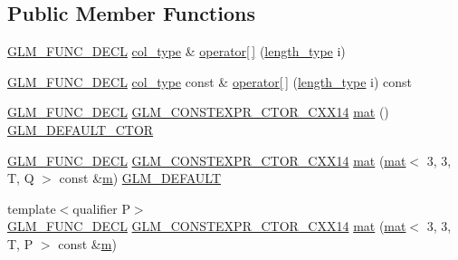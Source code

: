 \subsection*{Public Member Functions}
\begin{DoxyCompactItemize}
\item 
\hyperlink{setup_8hpp_ab2d052de21a70539923e9bcbf6e83a51}{G\+L\+M\+\_\+\+F\+U\+N\+C\+\_\+\+D\+E\+CL} \hyperlink{structglm_1_1mat_3_013_00_013_00_01_t_00_01_q_01_4_a4d84bef3685131dbb0ac43cac0a3b147}{col\+\_\+type} \& \hyperlink{structglm_1_1mat_3_013_00_013_00_01_t_00_01_q_01_4_a2507891a0a3b6c233c4f8a58071a7d9e}{operator\mbox{[}$\,$\mbox{]}} (\hyperlink{structglm_1_1mat_3_013_00_013_00_01_t_00_01_q_01_4_ae1b8524f20936516a48384a2841b5b9d}{length\+\_\+type} i)
\item 
\hyperlink{setup_8hpp_ab2d052de21a70539923e9bcbf6e83a51}{G\+L\+M\+\_\+\+F\+U\+N\+C\+\_\+\+D\+E\+CL} \hyperlink{structglm_1_1mat_3_013_00_013_00_01_t_00_01_q_01_4_a4d84bef3685131dbb0ac43cac0a3b147}{col\+\_\+type} const  \& \hyperlink{structglm_1_1mat_3_013_00_013_00_01_t_00_01_q_01_4_abce9d671a13bf9f9a315b7f8b5042617}{operator\mbox{[}$\,$\mbox{]}} (\hyperlink{structglm_1_1mat_3_013_00_013_00_01_t_00_01_q_01_4_ae1b8524f20936516a48384a2841b5b9d}{length\+\_\+type} i) const
\item 
\hyperlink{setup_8hpp_ab2d052de21a70539923e9bcbf6e83a51}{G\+L\+M\+\_\+\+F\+U\+N\+C\+\_\+\+D\+E\+CL} \hyperlink{setup_8hpp_a0900f9145e68bf6061b6f5e7be3fa751}{G\+L\+M\+\_\+\+C\+O\+N\+S\+T\+E\+X\+P\+R\+\_\+\+C\+T\+O\+R\+\_\+\+C\+X\+X14} \hyperlink{structglm_1_1mat_3_013_00_013_00_01_t_00_01_q_01_4_ab10ee3449d1ee8d793fed6b94fe6270d}{mat} () \hyperlink{setup_8hpp_afb97a4e995bc004c0cbbfa22125b80ba}{G\+L\+M\+\_\+\+D\+E\+F\+A\+U\+L\+T\+\_\+\+C\+T\+OR}
\item 
\hyperlink{setup_8hpp_ab2d052de21a70539923e9bcbf6e83a51}{G\+L\+M\+\_\+\+F\+U\+N\+C\+\_\+\+D\+E\+CL} \hyperlink{setup_8hpp_a0900f9145e68bf6061b6f5e7be3fa751}{G\+L\+M\+\_\+\+C\+O\+N\+S\+T\+E\+X\+P\+R\+\_\+\+C\+T\+O\+R\+\_\+\+C\+X\+X14} \hyperlink{structglm_1_1mat_3_013_00_013_00_01_t_00_01_q_01_4_a15f1bac6c533d3d97a2caefbbe13f4c1}{mat} (\hyperlink{structglm_1_1mat}{mat}$<$ 3, 3, T, Q $>$ const \&\hyperlink{_s_d_l__opengl__glext_8h_af593500c283bf1a787a6f947f503a5c2}{m}) \hyperlink{setup_8hpp_aefce7051c376a64ba89fa93a9f63bc2c}{G\+L\+M\+\_\+\+D\+E\+F\+A\+U\+LT}
\item 
{\footnotesize template$<$qualifier P$>$ }\\\hyperlink{setup_8hpp_ab2d052de21a70539923e9bcbf6e83a51}{G\+L\+M\+\_\+\+F\+U\+N\+C\+\_\+\+D\+E\+CL} \hyperlink{setup_8hpp_a0900f9145e68bf6061b6f5e7be3fa751}{G\+L\+M\+\_\+\+C\+O\+N\+S\+T\+E\+X\+P\+R\+\_\+\+C\+T\+O\+R\+\_\+\+C\+X\+X14} \hyperlink{structglm_1_1mat_3_013_00_013_00_01_t_00_01_q_01_4_a03d7907b53e23d522516d4cc951d9b43}{mat} (\hyperlink{structglm_1_1mat}{mat}$<$ 3, 3, T, P $>$ const \&\hyperlink{_s_d_l__opengl__glext_8h_af593500c283bf1a787a6f947f503a5c2}{m})

\end{DoxyCompactItemize}
